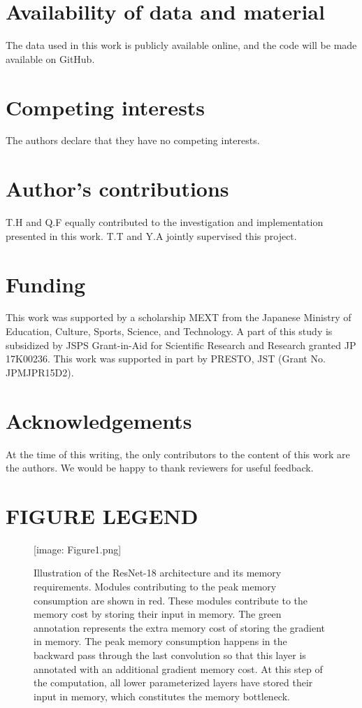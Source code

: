 \documentclass[twocolumn]{bmcart}
\def\texttt{[image: ]}
\begin{document}
\begin{backmatter}
\section*{Availability of data and material}
The data used in this work is publicly available online, and the code will be made available on GitHub.

\section*{Competing interests}
The authors declare that they have no competing interests.

\section*{Author's contributions}
T.H and Q.F equally contributed to the investigation and implementation presented in this work. T.T and Y.A jointly supervised this project.

\section*{Funding}
This work was supported by a scholarship MEXT from the Japanese Ministry of Education, Culture, Sports, Science, and Technology. 
A part of this study is subsidized by JSPS Grant-in-Aid for Scientific Research and Research granted JP 17K00236. 
This work was supported in part by PRESTO, JST (Grant No. JPMJPR15D2).

\section*{Acknowledgements}
At the time of this writing, the only contributors to the content of this work are the authors. 
We would be happy to thank reviewers for useful feedback.




\section*{FIGURE LEGEND}

\begin{figure}[t]
\texttt{[image: Figure1.png]}
\caption{
Illustration of the ResNet-18 architecture and its memory requirements.
Modules contributing to the peak memory consumption are shown in red.
These modules contribute to the memory cost by storing their input in memory.
The green annotation represents the extra memory cost of storing the gradient in memory.
The peak memory consumption happens in the backward pass through the last convolution so that this layer is annotated with an additional gradient memory cost.
At this step of the computation, all lower parameterized layers have stored their input in memory, which constitutes the memory bottleneck.  
}
\end{figure}


\end{backmatter}
\end{document}
